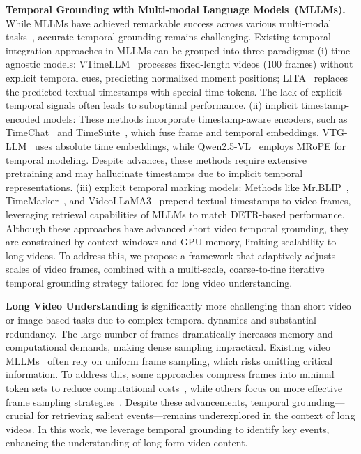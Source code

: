\noindent \textbf{Temporal Grounding with Multi-modal Language Models~(MLLMs).}
While MLLMs have achieved remarkable success across various multi-modal tasks~\cite{lai2024lisa,pi2023detgpt,liu2024lamra}, accurate temporal grounding remains challenging. Existing temporal integration approaches in MLLMs can be grouped into three paradigms:
(i) time-agnostic models: VTimeLLM~\cite{huang2024vtimellm} processes fixed-length videos (100 frames) without explicit temporal cues, predicting normalized moment positions; LITA~\cite{huang2024lita} replaces the predicted textual timestamps with special time tokens. The lack of explicit temporal signals often leads to suboptimal performance.
(ii) implicit timestamp-encoded models: These methods incorporate timestamp-aware encoders, such as TimeChat~\cite{ren2024timechat} and TimeSuite~\cite{zeng2024timesuite}, which fuse frame and temporal embeddings. VTG-LLM~\cite{guo2025vtg} uses absolute time embeddings, while Qwen2.5-VL~\cite{bai2025qwen2} employs MRoPE for temporal modeling. Despite advances, these methods require extensive pretraining and may hallucinate timestamps due to implicit temporal representations.
(iii) explicit temporal marking models: Methods like Mr.BLIP~\cite{meinardus2024surprising}, TimeMarker~\cite{chen2024timemarker}, and VideoLLaMA3~\cite{zhang2025videollama} prepend textual timestamps to video frames, leveraging retrieval capabilities of MLLMs to match DETR-based performance.
Although these approaches have advanced short video temporal grounding, they are constrained by context windows and GPU memory, limiting scalability to long videos. To address this, we propose a framework that adaptively adjusts scales of video frames, combined with a multi-scale, coarse-to-fine iterative temporal grounding strategy tailored for long video understanding.

\noindent \textbf{Long Video Understanding} is significantly more challenging than short video or image-based tasks due to complex temporal dynamics and substantial redundancy. The large number of frames dramatically increases memory and computational demands, making dense sampling impractical. Existing video MLLMs~\cite{bai2025qwen2,wang2024qwen2,zhang2024video} often rely on uniform frame sampling, which risks omitting critical information. To address this, some approaches compress frames into minimal token sets to reduce computational costs~\cite{shen2024longvu,li2024videochat,zhang2024beyond}, while others focus on more effective frame sampling strategies~\cite{ye2025re,tang2025adaptive,hu2025m,di2025rekv}.
Despite these advancements, temporal grounding—crucial for retrieving salient events—remains underexplored in the context of long videos. In this work, we leverage temporal grounding to identify key events, enhancing the understanding of long-form video content.

